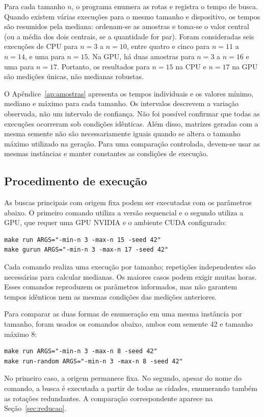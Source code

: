 \documentclass[12pt,a4paper]{article}
\begin{document}
Para cada tamanho $n$, o programa enumera as rotas e registra o tempo de busca. Quando existem várias execuções para o mesmo tamanho e dispositivo, os tempos são resumidos pela mediana: ordenam-se as amostras e toma-se o valor central (ou a média dos dois centrais, se a quantidade for par). Foram consideradas seis execuções de CPU para $n=3$ a $n=10$, entre quatro e cinco para $n=11$ a $n=14$, e uma para $n=15$. Na GPU, há duas amostras para $n=3$ a $n=16$ e uma para $n=17$. Portanto, os resultados para $n=15$ na CPU e $n=17$ na GPU são medições únicas, não medianas robustas.

O Apêndice~\ref{ap:amostras} apresenta os tempos individuais e os valores mínimo, mediano e máximo para cada tamanho. Os intervalos descrevem a variação observada, não um intervalo de confiança. Não foi possível confirmar que todas as execuções ocorreram sob condições idênticas. Além disso, matrizes geradas com a mesma semente não são necessariamente iguais quando se altera o tamanho máximo utilizado na geração. Para uma comparação controlada, devem-se usar as mesmas instâncias e manter constantes as condições de execução.

\subsection{Procedimento de execução}

As buscas principais com origem fixa podem ser executadas com os parâmetros abaixo. O primeiro comando utiliza a versão sequencial e o segundo utiliza a GPU, que requer uma GPU NVIDIA e o ambiente CUDA configurado:
\begin{verbatim}
make run ARGS="-min-n 3 -max-n 15 -seed 42"
make gurun ARGS="-min-n 3 -max-n 17 -seed 42"
\end{verbatim}
Cada comando realiza uma execução por tamanho; repetições independentes são necessárias para calcular medianas. Os maiores casos podem exigir muitas horas. Esses comandos reproduzem os parâmetros informados, mas não garantem tempos idênticos nem as mesmas condições das medições anteriores.

Para comparar as duas formas de enumeração em uma mesma instância por tamanho, foram usados os comandos abaixo, ambos com semente 42 e tamanho máximo 8:
\begin{verbatim}
make run ARGS="-min-n 3 -max-n 8 -seed 42"
make run-random ARGS="-min-n 3 -max-n 8 -seed 42"
\end{verbatim}
No primeiro caso, a origem permanece fixa. No segundo, apesar do nome do comando, a busca é executada a partir de todas as cidades, enumerando também as rotações redundantes. A comparação correspondente aparece na Seção~\ref{sec:reducao}.
\end{document}
